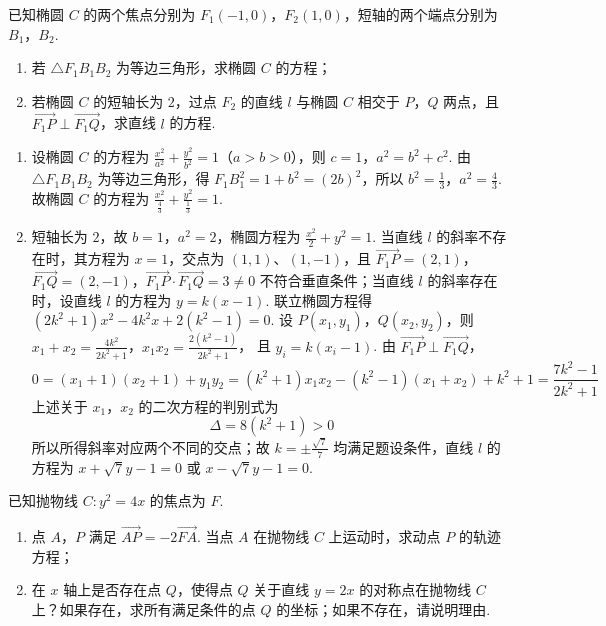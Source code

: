 \begin{problem}
已知椭圆 \(C\) 的两个焦点分别为 \( F_{1}(-1,0) \)，\( F_{2}(1,0) \)，短轴的两个端点分别为 \(B_{1}\)，\(B_{2}\).

\begin{enumerate}
\item 若 \( \triangle F_{1}B_{1}B_{2} \) 为等边三角形，求椭圆 \(C\) 的方程；
\item 若椭圆 \(C\) 的短轴长为 \(2\)，过点 \(F_{2}\) 的直线 \( l \) 与椭圆 \(C\) 相交于 \(P\)，\(Q\) 两点，且 \( \overrightarrow{F_{1}P} \perp \overrightarrow{F_{1}Q} \)，求直线 \( l \) 的方程.
\end{enumerate}
\end{problem}

\begin{solution}
\begin{enumerate}
\item 设椭圆 \(C\) 的方程为 \(\frac{x^2}{a^2}+\frac{y^2}{b^2}=1\)（\(a>b>0\)），则 \(c=1\)，\(a^2=b^2+c^2\). 由 \(\triangle F_1B_1B_2\) 为等边三角形，得 \(F_1B_1^2=1+b^2=(2b)^2\)，所以 \(b^2=\frac13\)，\(a^2=\frac43\). 故椭圆 \(C\) 的方程为
\(\frac{x^2}{\frac{4}{3}}+\frac{y^2}{\frac{1}{3}}=1\).

\item 短轴长为 \(2\)，故 \(b=1\)，\(a^2=2\)，椭圆方程为 \(\frac{x^2}{2}+y^2=1\). 当直线 \(l\) 的斜率不存在时，其方程为 \(x=1\)，交点为 \((1,1)\)、\((1,-1)\)，且
\(\overrightarrow{F_1P}=(2,1)\)，\(\overrightarrow{F_1Q}=(2,-1)\)，\(\overrightarrow{F_1P}\cdot\overrightarrow{F_1Q}=3\ne0\)
不符合垂直条件；当直线 \(l\) 的斜率存在时，设直线 \(l\) 的方程为 \(y=k(x-1)\). 联立椭圆方程得
\((2k^2+1)x^2-4k^2x+2(k^2-1)=0\).
设 \(P(x_1,y_1)\)，\(Q(x_2,y_2)\)，则
\(x_1+x_2=\frac{4k^2}{2k^2+1}\)，\(x_1x_2=\frac{2(k^2-1)}{2k^2+1}\)，
且 \(y_i=k(x_i-1)\). 由 \(\overrightarrow{F_1P}\perp\overrightarrow{F_1Q}\)，
\[
0=(x_1+1)(x_2+1)+y_1y_2
=(k^2+1)x_1x_2-(k^2-1)(x_1+x_2)+k^2+1
=\frac{7k^2-1}{2k^2+1}
\]
上述关于 \(x_1\)，\(x_2\) 的二次方程的判别式为
\[
\Delta=8(k^2+1)>0
\]
所以所得斜率对应两个不同的交点；故 \(k=\pm\frac{\sqrt7}{7}\) 均满足题设条件，直线 \(l\) 的方程为 \(x+\sqrt7y-1=0\) 或 \(x-\sqrt7y-1=0\).
\end{enumerate}
\end{solution}

\begin{problem}
已知抛物线 \( C: y^{2} = 4x \) 的焦点为 \(F\).

\begin{enumerate}
\item 点 \(A\)，\(P\) 满足 \( \overrightarrow{AP} = -2\overrightarrow{FA} \). 当点 \(A\) 在抛物线 \(C\) 上运动时，求动点 \(P\) 的轨迹方程；
\item 在 \(x\) 轴上是否存在点 \(Q\)，使得点 \(Q\) 关于直线 \( y = 2x \) 的对称点在抛物线 \(C\) 上？如果存在，求所有满足条件的点 \(Q\) 的坐标；如果不存在，请说明理由.
\end{enumerate}
\end{problem}

